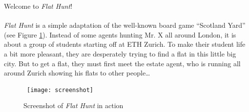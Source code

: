 Welcome to \emph{Flat Hunt}!

\paragraph{}
\emph{Flat Hunt} is a simple adaptation of the well-known board game ``Scotland Yard'' (see Figure \ref{screenshot}). Instead of some agents hunting Mr. X all around London, it is about a group of students starting off at ETH Zurich. To make their student life a bit more pleasant, they are desperately trying to find a flat in this little big city. But to get a flat, they must first meet the estate agent, who is running all around Zurich showing his flats to other people\ldots

\begin{figure}[h]
  \centerline{\hbox{
    \texttt{[image: screenshot]}
  }}
\caption{Screenshot of \emph{Flat Hunt} in action}
\label{screenshot}
\end{figure}
